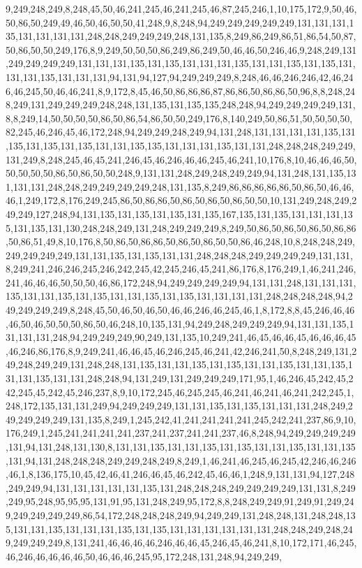 9,249,248,249,8,248,45,50,46,241,245,46,241,245,46,87,245,246,1,10,175,172,9,50,46,50,86,50,249,49,46,50,46,50,50,41,248,9,8,248,94,249,249,249,249,249,131,131,131,135,131,131,131,131,248,248,249,249,249,248,131,135,8,249,86,249,86,51,86,54,50,87,50,86,50,50,249,176,8,9,249,50,50,50,86,249,86,249,50,46,46,50,246,46,9,248,249,131,249,249,249,249,131,131,131,135,131,135,131,131,131,135,131,131,135,131,135,131,131,131,135,131,131,131,94,131,94,127,94,249,249,249,8,248,46,46,246,246,42,46,246,46,245,50,46,46,241,8,9,172,8,45,46,50,86,86,86,87,86,86,50,86,86,50,96,8,8,248,248,249,131,249,249,249,248,248,131,135,131,135,135,248,248,94,249,249,249,249,131,8,8,249,14,50,50,50,50,86,50,86,54,86,50,50,249,176,8,140,249,50,86,51,50,50,50,50,82,245,46,246,45,46,172,248,94,249,249,248,249,94,131,248,131,131,131,131,135,131,135,131,135,131,135,131,131,135,135,131,131,131,135,131,131,248,248,248,249,249,131,249,8,248,245,46,45,241,246,45,46,246,46,46,245,46,241,10,176,8,10,46,46,46,50,50,50,50,50,86,50,86,50,50,248,9,131,131,248,249,248,249,249,94,131,248,131,135,131,131,131,248,248,249,249,249,249,248,131,135,8,249,86,86,86,86,86,50,86,50,46,46,46,1,249,172,8,176,249,245,86,50,86,86,50,86,50,86,50,86,50,50,10,131,249,248,249,249,249,127,248,94,131,135,131,135,131,135,131,135,167,135,131,135,131,131,131,135,131,135,131,130,248,248,249,131,248,249,249,249,8,249,50,86,50,86,50,86,50,86,86,50,86,51,49,8,10,176,8,50,86,50,86,86,50,86,50,86,50,50,86,46,248,10,8,248,248,249,249,249,249,249,131,131,135,131,135,131,131,248,248,248,249,249,249,249,131,131,8,249,241,246,246,245,246,242,245,42,245,246,45,241,86,176,8,176,249,1,46,241,246,241,46,46,46,50,50,50,46,86,172,248,94,249,249,249,249,94,131,131,248,131,131,131,135,131,131,135,131,135,131,131,135,131,135,131,131,131,131,248,248,248,248,94,249,249,249,249,8,248,45,50,46,50,46,50,46,46,246,46,245,46,1,8,172,8,8,45,246,46,46,46,50,46,50,50,50,86,50,46,248,10,135,131,94,249,248,249,249,249,94,131,131,135,131,131,131,248,94,249,249,249,90,249,131,135,10,249,241,46,45,46,46,45,46,46,46,45,46,246,86,176,8,9,249,241,46,46,45,46,246,245,46,241,42,246,241,50,8,248,249,131,249,248,249,249,131,248,248,131,135,131,131,135,131,135,131,131,135,131,131,135,131,131,135,131,131,248,248,94,131,249,131,249,249,249,171,95,1,46,246,45,242,45,242,245,45,242,45,246,237,8,9,10,172,245,46,245,245,46,241,46,241,46,241,242,245,1,248,172,135,131,131,249,94,249,249,249,131,131,135,131,135,131,131,131,248,249,249,249,249,249,131,135,8,249,1,245,242,41,241,241,241,241,245,242,241,237,86,9,10,176,249,1,245,241,241,241,241,237,241,237,241,241,237,46,8,248,94,249,249,249,249,131,94,131,248,131,130,8,131,131,135,131,131,135,131,135,131,131,135,131,131,135,131,94,131,248,248,248,249,249,248,249,8,249,1,46,241,46,245,46,245,42,246,46,246,46,1,8,136,175,10,45,42,46,41,246,46,45,46,242,45,46,46,1,248,9,131,131,94,127,248,249,249,94,131,131,131,131,131,135,131,248,248,248,249,249,249,249,131,131,8,249,249,95,248,95,95,95,131,91,95,131,248,249,95,172,8,8,248,249,249,91,249,91,249,249,249,249,249,249,86,54,172,248,248,248,249,94,249,249,131,248,248,131,248,248,135,131,131,135,131,131,131,135,131,135,131,131,131,131,131,131,248,248,249,248,249,249,249,249,8,131,241,46,46,46,46,246,46,46,45,246,45,46,241,8,10,172,171,46,245,46,246,46,46,46,46,50,46,46,46,245,95,172,248,131,248,94,249,249,